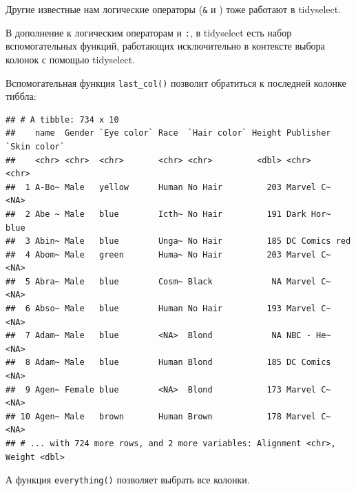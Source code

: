 \documentclass[]{book}
\newenvironment{Shaded}{\begin{snugshade}}{\end{snugshade}}
\newcommand{\KeywordTok}[1]{\textcolor[rgb]{0.13,0.29,0.53}{\textbf{#1}}}
\newcommand{\StringTok}[1]{\textcolor[rgb]{0.31,0.60,0.02}{#1}}
\newcommand{\OperatorTok}[1]{\textcolor[rgb]{0.81,0.36,0.00}{\textbf{#1}}}
\newcommand{\NormalTok}[1]{#1}
\begin{document}
Другие известные нам логические операторы (\texttt{\&} и
\texttt{\textbar{}}) тоже работают в tidyselect.

В дополнение к логическим операторам и \texttt{:}, в tidyselect есть
набор вспомогательных функций, работающих исключительно в контексте
выбора колонок с помощью tidyselect.

Вспомогательная функция \texttt{last\_col()} позволит обратиться к
последней колонке тиббла:

\begin{Shaded}
\end{Shaded}

\begin{verbatim}
## # A tibble: 734 x 10
##    name  Gender `Eye color` Race  `Hair color` Height Publisher `Skin color`
##    <chr> <chr>  <chr>       <chr> <chr>         <dbl> <chr>     <chr>       
##  1 A-Bo~ Male   yellow      Human No Hair         203 Marvel C~ <NA>        
##  2 Abe ~ Male   blue        Icth~ No Hair         191 Dark Hor~ blue        
##  3 Abin~ Male   blue        Unga~ No Hair         185 DC Comics red         
##  4 Abom~ Male   green       Huma~ No Hair         203 Marvel C~ <NA>        
##  5 Abra~ Male   blue        Cosm~ Black            NA Marvel C~ <NA>        
##  6 Abso~ Male   blue        Human No Hair         193 Marvel C~ <NA>        
##  7 Adam~ Male   blue        <NA>  Blond            NA NBC - He~ <NA>        
##  8 Adam~ Male   blue        Human Blond           185 DC Comics <NA>        
##  9 Agen~ Female blue        <NA>  Blond           173 Marvel C~ <NA>        
## 10 Agen~ Male   brown       Human Brown           178 Marvel C~ <NA>        
## # ... with 724 more rows, and 2 more variables: Alignment <chr>, Weight <dbl>
\end{verbatim}

А функция \texttt{everything()} позволяет выбрать все колонки.

\begin{Shaded}
\end{Shaded}
\end{document}
